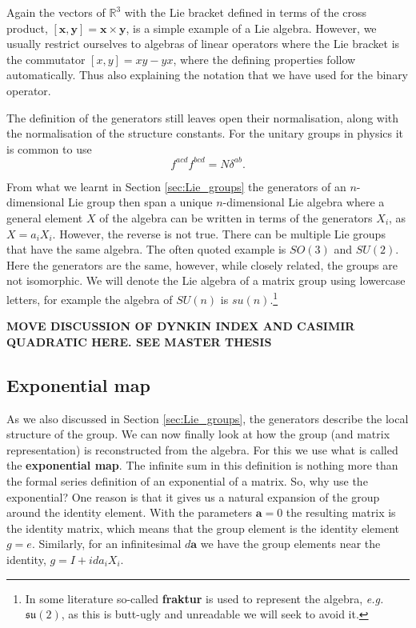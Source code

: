 \documentclass[notes.tex]{subfiles}
\begin{document}
Again the vectors of $\mathbb{R}^3$ with the Lie bracket defined in terms of the cross product, $[\mathbf x, \mathbf y]=\mathbf x \times \mathbf y$, is a simple example of a Lie algebra. However, we usually restrict ourselves to algebras of linear operators where the Lie bracket is the commutator $[x,y] = xy-yx$, where the defining properties follow automatically. Thus also explaining the notation that we have used for the binary operator.

The definition of the generators still leaves open their normalisation, along with the normalisation of the structure constants. For the unitary groups in physics it is common to use
\begin{equation}
f^{acd}f^{bcd}=N\delta^{ab}.
\label{eq:generator_normalisation}
\end{equation}

From what we learnt in Section \ref{sec:Lie_groups} the generators of an $n$-dimensional Lie group then span a unique $n$-dimensional Lie algebra where a general element $X$ of the algebra can be written in terms of the generators $X_i$, as $X=a_iX_i$. However, the reverse is not true. There can be multiple Lie groups that have the same algebra. The often quoted example is $SO(3)$ and $SU(2)$. Here the generators are the same, however, while closely related, the groups are not isomorphic. We will denote the Lie algebra of a matrix group using lowercase letters, for example the algebra of $SU(n)$ is $su(n)$.\footnote{In some literature so-called {\bf fraktur} is used to represent the algebra, {\it e.g.}\ $\mathfrak{su(2)}$, as this is butt-ugly and unreadable we will seek to avoid it. }

{\bf MOVE DISCUSSION OF DYNKIN INDEX AND CASIMIR QUADRATIC HERE. SEE MASTER THESIS}

\subsection{Exponential map}
\label{sec:expmap}
As we also discussed in Section \ref{sec:Lie_groups}, the generators describe the local structure of the group.
We can now finally look at how the group (and matrix representation) is reconstructed from the algebra. For this we use what is called the {\bf exponential map}. 
The infinite sum in this definition is nothing more than the formal series definition of an exponential of a matrix. So, why use the exponential? One reason is that it gives us a natural expansion of the group around the identity element. With the parameters $\mathbf a=0$ the resulting matrix is the identity matrix, which means that the group element is the identity element $g=e$. Similarly, for an infinitesimal $d\mathbf a$ we have the group elements near the identity, $g=I+ida_iX_i$.
\end{document}
